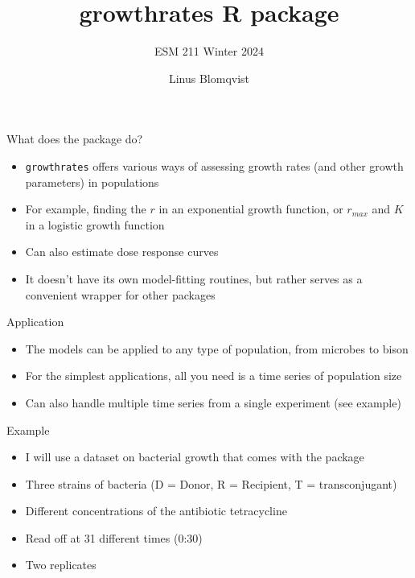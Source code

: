 \documentclass[
  ignorenonframetext,
]{beamer}
\title{growthrates R package}
\subtitle{ESM 211 Winter 2024}
\author{Linus Blomqvist}
\date{}
\providecommand{\tightlist}{%
  \setlength{\itemsep}{0pt}\setlength{\parskip}{0pt}}
\begin{document}
\frame{\titlepage}

\begin{frame}[fragile]{What does the package do?}
\protect\hypertarget{what-does-the-package-do}{}
\begin{itemize}
\tightlist
\item
  \texttt{growthrates} offers various ways of assessing growth rates
  (and other growth parameters) in populations
\item
  For example, finding the \(r\) in an exponential growth function, or
  \(r_{max}\) and \(K\) in a logistic growth function
\item
  Can also estimate dose response curves
\item
  It doesn't have its own model-fitting routines, but rather serves as a
  convenient wrapper for other packages
\end{itemize}
\end{frame}

\begin{frame}{Application}
\protect\hypertarget{application}{}
\begin{itemize}
\tightlist
\item
  The models can be applied to any type of population, from microbes to
  bison
\item
  For the simplest applications, all you need is a time series of
  population size
\item
  Can also handle multiple time series from a single experiment (see
  example)
\end{itemize}
\end{frame}

\begin{frame}{Example}
\protect\hypertarget{example}{}
\begin{itemize}
\tightlist
\item
  I will use a dataset on bacterial growth that comes with the package
\item
  Three strains of bacteria (D = Donor, R = Recipient, T =
  transconjugant)
\item
  Different concentrations of the antibiotic tetracycline
\item
  Read off at 31 different times (0:30)
\item
  Two replicates
\end{itemize}
\end{frame}
\end{document}
